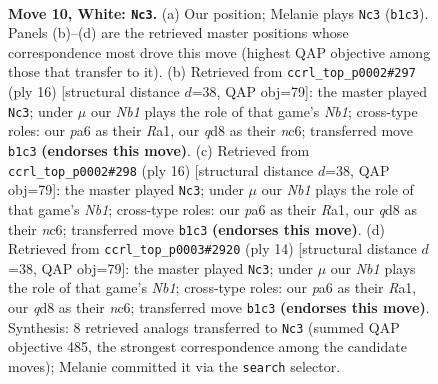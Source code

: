 \documentclass[11pt]{article}
\begin{document}
\clearpage

\begin{figure}[p]\centering
\begin{subfigure}{0.46\textwidth}\centering
\resizebox{\linewidth}{!}{%
\newchessgame
\chessboard[
  setfen={rnbqkb1r/1p3p2/p3pnp1/7p/P2P4/1B3N2/1P3PPP/RNBQ1RK1 w kq - 0 10},
  showmover=false,
  pgfstyle=straightmove, color=movearrow, markmove={b1-c3}
]}
\caption{}
\end{subfigure}\hfill
\begin{subfigure}{0.46\textwidth}\centering
\resizebox{\linewidth}{!}{%
\newchessgame
\chessboard[
  setfen={r1bqkb1r/pp3ppp/2n1pn2/8/2BP4/5N2/PP3PPP/RNBQ1RK1 w kq - 1 9},
  showmover=false,
  pgfstyle=straightmove, color=movearrow, markmove={b1-c3}
]}
\caption{}
\end{subfigure}
\\[4pt]
\begin{subfigure}{0.46\textwidth}\centering
\resizebox{\linewidth}{!}{%
\newchessgame
\chessboard[
  setfen={r1bqkb1r/pp3ppp/2n1pn2/8/2BP4/5N2/PP3PPP/RNBQ1RK1 w kq - 1 9},
  showmover=false,
  pgfstyle=straightmove, color=movearrow, markmove={b1-c3}
]}
\caption{}
\end{subfigure}\hfill
\begin{subfigure}{0.46\textwidth}\centering
\resizebox{\linewidth}{!}{%
\newchessgame
\chessboard[
  setfen={r1bqkb1r/pp3ppp/2n1pn2/8/2BP4/5N2/PP3PPP/RNBQ1RK1 w kq - 1 8},
  showmover=false,
  pgfstyle=straightmove, color=movearrow, markmove={b1-c3}
]}
\caption{}
\end{subfigure}
\caption{\textbf{Move 10, White: \texttt{Nc3}.} (a) Our position; Melanie plays \texttt{Nc3} (\texttt{b1c3}). Panels (b)--(d) are the retrieved master positions whose correspondence most drove this move (highest QAP objective among those that transfer to it). (b) Retrieved from \texttt{ccrl\_top\_p0002\#297} (ply 16) [structural distance $d$=38, QAP obj=79]: the master played \texttt{Nc3}; under $\mu$ our \emph{Nb1} plays the role of that game's \emph{Nb1}; cross-type roles: our \emph{p}a6 as their \emph{R}a1, our \emph{q}d8 as their \emph{n}c6; transferred move \texttt{b1c3} \textbf{(endorses this move)}. (c) Retrieved from \texttt{ccrl\_top\_p0002\#298} (ply 16) [structural distance $d$=38, QAP obj=79]: the master played \texttt{Nc3}; under $\mu$ our \emph{Nb1} plays the role of that game's \emph{Nb1}; cross-type roles: our \emph{p}a6 as their \emph{R}a1, our \emph{q}d8 as their \emph{n}c6; transferred move \texttt{b1c3} \textbf{(endorses this move)}. (d) Retrieved from \texttt{ccrl\_top\_p0003\#2920} (ply 14) [structural distance $d$=38, QAP obj=79]: the master played \texttt{Nc3}; under $\mu$ our \emph{Nb1} plays the role of that game's \emph{Nb1}; cross-type roles: our \emph{p}a6 as their \emph{R}a1, our \emph{q}d8 as their \emph{n}c6; transferred move \texttt{b1c3} \textbf{(endorses this move)}. Synthesis: 8 retrieved analogs transferred to \texttt{Nc3} (summed QAP objective 485, the strongest correspondence among the candidate moves); Melanie committed it via the \texttt{search} selector.}
\label{fig:thought-m18}
\end{figure}
\end{document}
